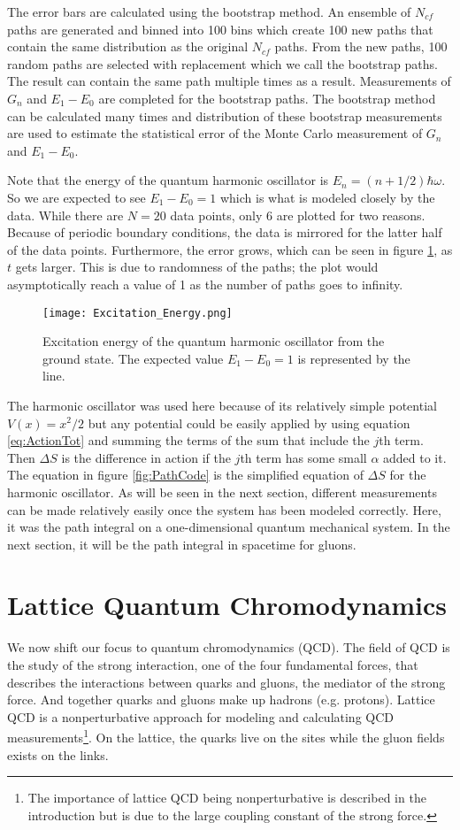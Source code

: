 \documentclass[11pt]{article}
\begin{document}
The error bars are calculated using the bootstrap method. An ensemble of $N_{cf}$ paths are generated and binned into 100 bins which create 100 new paths that contain the same distribution as the original $N_{cf}$ paths. From the new paths, 100 random paths are selected with replacement which we call the bootstrap paths. The result can contain the same path multiple times as a result. Measurements of $G_n$ and $E_1-E_0$ are completed for the bootstrap paths. The bootstrap method can be calculated many times and distribution of these bootstrap measurements are used to estimate the statistical error of the Monte Carlo measurement of $G_n$ and $E_1-E_0$.

Note that the energy of the quantum harmonic oscillator is $E_n=(n+1/2)\hbar\omega$. So we are expected to see $E_1-E_0=1$ which is what is modeled closely by the data. While there are $N=20$ data points, only 6 are plotted for two reasons. Because of periodic boundary conditions, the data is mirrored for the latter half of the data points. Furthermore, the error grows, which can be seen in figure \ref{fig:ExciteE}, as $t$ gets larger. This is due to randomness of the paths; the plot would asymptotically reach a value of 1 as the number of paths goes to infinity.

\begin{figure}[h]
	\centering
	\texttt{[image: Excitation\_Energy.png]}
	\caption{Excitation energy of the quantum harmonic oscillator from the ground state. The expected value $E_1-E_0=1$ is represented by the line.}
	\label{fig:ExciteE}
\end{figure}

The harmonic oscillator was used here because of its relatively simple potential $V(x)=x^2/2$ but any potential could be easily applied by using equation \ref{eq:ActionTot} and summing the terms of the sum that include the $j$th term. Then $\Delta S$ is the difference in action if the $j$th term has some small $\alpha$ added to it. The equation in figure \ref{fig:PathCode} is the simplified equation of $\Delta S$ for the harmonic oscillator. As will be seen in the next section, different measurements can be made relatively easily once the system has been modeled correctly. Here, it was the path integral on a one-dimensional quantum mechanical system. In the next section, it will be the path integral in spacetime for gluons.

\section{Lattice Quantum Chromodynamics}
We now shift our focus to quantum chromodynamics (QCD). The field of QCD is the study of the strong interaction, one of the four fundamental forces, that describes the interactions between quarks and gluons, the mediator of the strong force. And together quarks and gluons make up hadrons (e.g. protons). Lattice QCD is a nonperturbative approach for modeling and calculating QCD measurements\footnote{The importance of lattice QCD being nonperturbative is described in the introduction but is due to the large coupling constant of the strong force.}. On the lattice, the quarks live on the sites while the gluon fields exists on the links.
\end{document}
